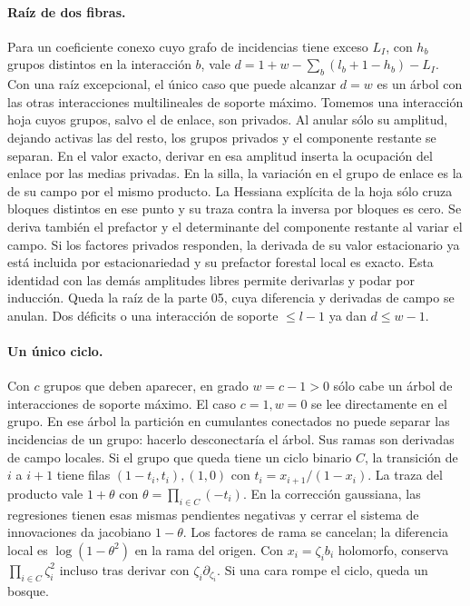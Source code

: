 \paragraph{Raíz de dos fibras.}
Para un coeficiente conexo cuyo grafo de incidencias tiene exceso $L_I$, con $h_b$
grupos distintos en la interacción $b$, vale $d=1+w-\sum_b(l_b+1-h_b)-L_I$.
Con una raíz excepcional, el único caso que puede alcanzar $d=w$ es un árbol
con las otras interacciones multilineales de soporte máximo. Tomemos una interacción hoja
cuyos grupos, salvo el de enlace, son privados. Al anular sólo su amplitud, dejando
activas las del resto, los grupos privados y el componente restante se separan.
En el valor exacto, derivar en esa amplitud inserta la ocupación del enlace por las
medias privadas. En la silla, la variación en el grupo de enlace es la de su campo por
el mismo producto. La Hessiana explícita de la hoja sólo cruza bloques distintos
en ese punto y su traza contra la inversa por bloques es cero. Se deriva también
el prefactor y el determinante del componente restante al variar el campo.
Si los factores privados responden, la derivada de su valor estacionario ya está
incluida por estacionariedad y su prefactor forestal local es exacto.
Esta identidad con las demás amplitudes libres permite derivarlas y podar por inducción.
Queda la raíz de la parte 05, cuya diferencia y derivadas de campo se anulan.
Dos déficits o una interacción de soporte $\le l-1$ ya dan $d\le w-1$.
\paragraph{Un único ciclo.}
Con $c$ grupos que deben aparecer, en grado $w=c-1>0$ sólo cabe un árbol
de interacciones de soporte máximo. El caso $c=1,w=0$ se lee directamente en el grupo.
En ese árbol la partición en cumulantes conectados no puede separar las incidencias
de un grupo: hacerlo desconectaría el árbol. Sus ramas son derivadas de campo locales.
Si el grupo que queda tiene un ciclo binario $C$, la transición de $i$ a $i+1$ tiene
filas $(1-t_i,t_i),(1,0)$ con $t_i=x_{i+1}/(1-x_i)$. La traza del producto
vale $1+\theta$ con $\theta=\prod_{i\in C}(-t_i)$. En la corrección gaussiana,
las regresiones tienen esas mismas pendientes negativas y cerrar el sistema de
innovaciones da jacobiano $1-\theta$. Los factores de rama se cancelan;
la diferencia local es $\log(1-\theta^2)$ en la rama del origen.
Con $x_i=\zeta_i b_i$ holomorfo, conserva $\prod_{i\in C}\zeta_i^2$ incluso tras
derivar con $\zeta_i\partial_{\zeta_i}$. Si una cara rompe el ciclo, queda un bosque.
